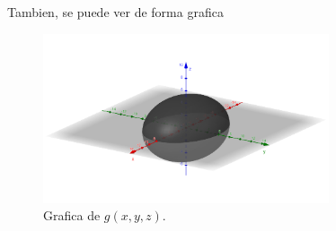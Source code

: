 \begin{solution}
    Tambien, se puede ver de forma grafica
\begin{figure}[h!] %
    \centering
    \includegraphics[width=0.75\textwidth]{../figs/Grafico_elipsoide.png}
    \caption{Grafica de $g(x,y,z)$.}
    \label{fig:ejemplo} %
\end{figure}

\end{solution}


